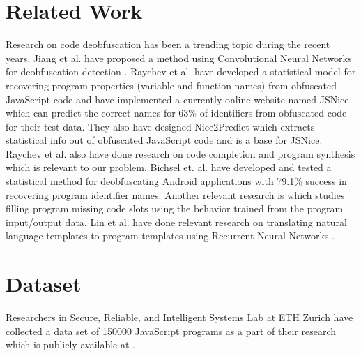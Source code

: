 \documentclass{rureport}
\begin{document}
\section{Related Work}
Research on code deobfuscation has been a trending topic during the recent years. Jiang et al. have proposed a method using Convolutional Neural Networks for deobfuscation detection \cite{jiangcnn}. Raychev et al. have developed a statistical model for recovering program properties (variable and function names) from obfuscated JavaScript code \cite{jsnice1} and have implemented a currently online website named JSNice \cite{jsnice3} which can predict the correct names for 63\% of identifiers from obfuscated code for their test data. They also have designed Nice2Predict \cite{nice2predict} which extracts statistical info out of obfuscated JavaScript code and is a base for JSNice. Raychev et al. also have done research on code completion and program synthesis \cite{Raychev2014} which is relevant to our problem. Bichsel et. al. have developed and tested a statistical method for deobfuscating Android applications \cite{bichselandroid} with 79.1\% success in recovering program identifier names. Another relevant research is \cite{forth} which studies filling program missing code slots using the behavior trained from the program input/output data. Lin et al. have done relevant research on translating natural language templates to program templates using Recurrent Neural Networks \cite{nlprnn}.

\section{Dataset}
Researchers in Secure, Reliable, and Intelligent Systems Lab at ETH Zurich have collected a data set of 150000 JavaScript programs as a part of their research \cite{jsnice1} which is publicly available at \cite{bigcodedataset}.
\end{document}
